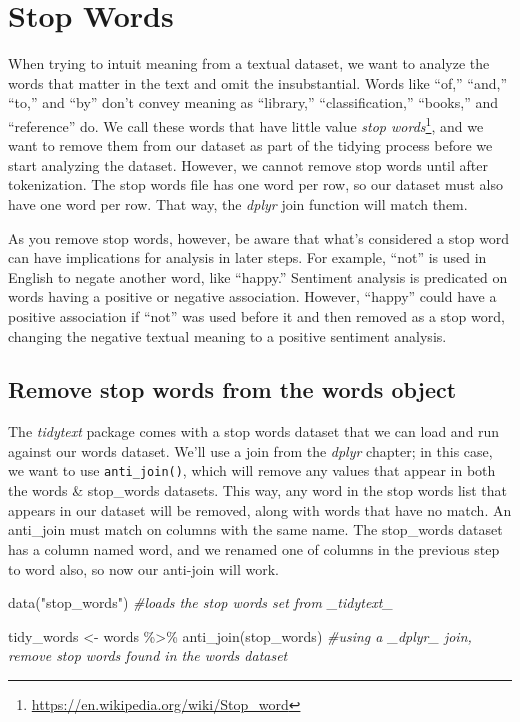 \documentclass[
  krantz2]{krantz}
\makeatletter
\newenvironment{Shaded}{\begin{snugshade}}{\end{snugshade}}
\newcommand{\CommentTok}[1]{\textcolor[rgb]{0.37,0.37,0.37}{\textit{#1}}}
\newcommand{\FunctionTok}[1]{\textcolor[rgb]{0,0,0}{#1}}
\newcommand{\NormalTok}[1]{#1}
\newcommand{\OtherTok}[1]{\textcolor[rgb]{0.37,0.37,0.37}{#1}}
\newcommand{\SpecialCharTok}[1]{\textcolor[rgb]{0,0,0}{#1}}
\newcommand{\StringTok}[1]{\textcolor[rgb]{0.5,0.5,0.5}{#1}}
\newenvironment{kframe}{%
\medskip{}
\setlength{\fboxsep}{.8em}
 \def\at@end@of@kframe{}%
 \ifinner\ifhmode%
  \def\at@end@of@kframe{\end{minipage}}%
  \begin{minipage}{\columnwidth}%
 \fi\fi%
 \def\FrameCommand##1{\hskip\@totalleftmargin \hskip-\fboxsep
 \colorbox{shadecolor}{##1}\hskip-\fboxsep
     \hskip-\linewidth \hskip-\@totalleftmargin \hskip\columnwidth}%
 \MakeFramed {\advance\hsize-\width
   \@totalleftmargin\z@ \linewidth\hsize
   \@setminipage}}%
 {\par\unskip\endMakeFramed%
 \at@end@of@kframe}
\renewenvironment{Shaded}{\begin{kframe}}{\end{kframe}}
\makeatother
\begin{document}
\hypertarget{stop-words}{%
\section{Stop Words}\label{stop-words}}

When trying to intuit meaning from a textual dataset, we want to analyze the words that matter in the text and omit the insubstantial. Words like ``of,'' ``and,'' ``to,'' and ``by'' don't convey meaning as ``library,'' ``classification,'' ``books,'' and ``reference'' do. We call these words that have little value \emph{stop words}\footnote{\url{https://en.wikipedia.org/wiki/Stop_word}}, and we want to remove them from our dataset as part of the tidying process before we start analyzing the dataset. However, we cannot remove stop words until after tokenization. The stop words file has one word per row, so our dataset must also have one word per row. That way, the \emph{dplyr} join function will match them.

As you remove stop words, however, be aware that what's considered a stop word can have implications for analysis in later steps. For example, ``not'' is used in English to negate another word, like ``happy.'' Sentiment analysis is predicated on words having a positive or negative association. However, ``happy'' could have a positive association if ``not'' was used before it and then removed as a stop word, changing the negative textual meaning to a positive sentiment analysis.

\hypertarget{remove-stopwords}{%
\subsection{Remove stop words from the words object}\label{remove-stopwords}}

The \emph{tidytext} package comes with a stop words dataset that we can load and run against our words dataset. We'll use a join from the \emph{dplyr} chapter; in this case, we want to use \texttt{anti\_join()}, which will remove any values that appear in both the words \& stop\_words datasets. This way, any word in the stop words list that appears in our dataset will be removed, along with words that have no match. An anti\_join must match on columns with the same name. The stop\_words dataset has a column named word, and we renamed one of columns in the previous step to word also, so now our anti-join will work.

\begin{Shaded}
\begin{Highlighting}[]
\FunctionTok{data}\NormalTok{(}\StringTok{"stop\_words"}\NormalTok{) }\CommentTok{\#loads the stop words set from \_tidytext\_}

\NormalTok{tidy\_words }\OtherTok{\textless{}{-}}\NormalTok{ words }\SpecialCharTok{\%\textgreater{}\%}
  \FunctionTok{anti\_join}\NormalTok{(stop\_words) }\CommentTok{\#using a \_dplyr\_ join, remove stop words found in the words dataset}
\end{Highlighting}
\end{Shaded}
\end{document}
